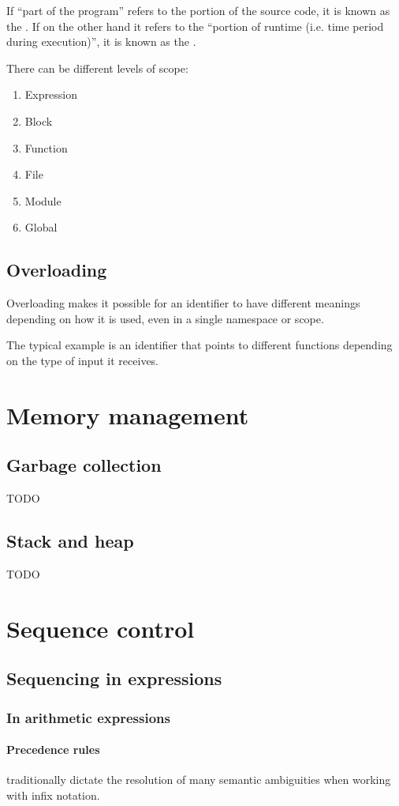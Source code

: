 If ``part of the program'' refers to the portion of the source code, it is known as the . If on the other hand it refers to the ``portion of runtime (i.e. time period during execution)'', it is known as the .

There can be different levels of scope:
\begin{enumerate}
\item Expression
\item Block
\item Function
\item File
\item Module
\item Global
\end{enumerate}

\subsection{Overloading}
Overloading makes it possible for an identifier to have different meanings depending on how it is used, even in a single namespace or scope.

The typical example is an identifier that points to different functions depending on the type of input it receives.

\section{Memory management}
\subsection{Garbage collection}
TODO
\subsection{Stack and heap}
TODO


\section{Sequence control}
\subsection{Sequencing in expressions}
\subsubsection{In arithmetic expressions}
\paragraph{Precedence rules} traditionally dictate the resolution of many semantic ambiguities when working with infix notation.
